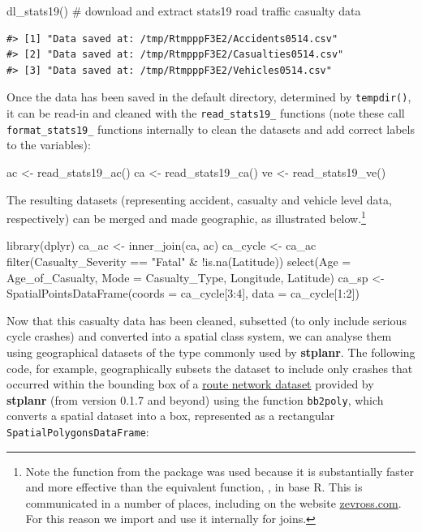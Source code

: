 \begin{Schunk}
\begin{Sinput}
dl_stats19() # download and extract stats19 road traffic casualty data
\end{Sinput}
\end{Schunk}

\begin{verbatim}
#> [1] "Data saved at: /tmp/RtmpppF3E2/Accidents0514.csv"
#> [2] "Data saved at: /tmp/RtmpppF3E2/Casualties0514.csv"
#> [3] "Data saved at: /tmp/RtmpppF3E2/Vehicles0514.csv"
\end{verbatim}

Once the data has been saved in the default directory, determined by
\texttt{tempdir()}, it can be read-in and cleaned with the
\texttt{read\_stats19\_} functions (note these call
\texttt{format\_stats19\_} functions internally to clean the datasets
and add correct labels to the variables):

\begin{Schunk}
\begin{Sinput}
ac <- read_stats19_ac()
ca <- read_stats19_ca()
ve <- read_stats19_ve()
\end{Sinput}
\end{Schunk}

The resulting datasets (representing accident, casualty and vehicle
level data, respectively) can be merged and made geographic, as
illustrated below.\footnote{
Note the  function from the  package was used because it is substantially faster and more effective than the equivalent function, , in base R.
This is communicated in a number of places, including on the website \href{http://zevross.com/blog/2014/04/30/mini-post-for-large-tables-in-r-dplyrs-function-inner_join-is-much-faster-than-merge/}{zevross.com}. For this reason we import  and use it internally for joins.}

\begin{Schunk}
\begin{Sinput}
library(dplyr)
ca_ac <- inner_join(ca, ac)
ca_cycle <- ca_ac %
  filter(Casualty_Severity == "Fatal" & !is.na(Latitude)) %
  select(Age = Age_of_Casualty, Mode = Casualty_Type, Longitude, Latitude)
ca_sp <- SpatialPointsDataFrame(coords = ca_cycle[3:4], data = ca_cycle[1:2])
\end{Sinput}
\end{Schunk}

Now that this casualty data has been cleaned, subsetted (to only include
serious cycle crashes) and converted into a spatial class system, we can
analyse them using geographical datasets of the type commonly used by
\textbf{stplanr}. The following code, for example, geographically
subsets the dataset to include only crashes that occurred within the
bounding box of a
\href{https://github.com/ropensci/stplanr/blob/master/data/route_network.rda?raw=true}{route
network dataset} provided by \textbf{stplanr} (from version 0.1.7 and
beyond) using the function \texttt{bb2poly}, which converts a spatial
dataset into a box, represented as a rectangular
\texttt{SpatialPolygonsDataFrame}:

